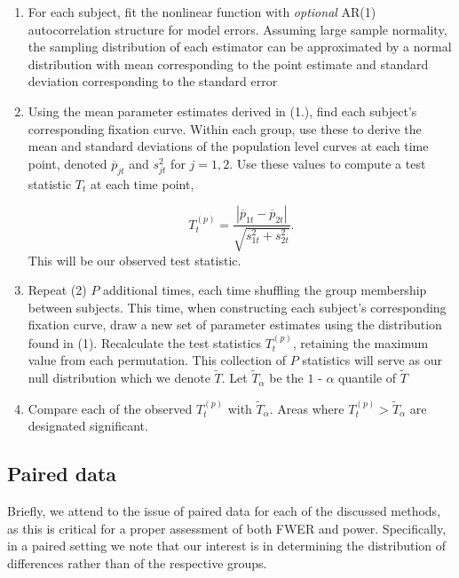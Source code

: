 \documentclass{article}
\begin{document}
\begin{enumerate}
\vspace{-2mm}
\item For each subject, fit the nonlinear function with \textit{optional} AR(1) autocorrelation structure for model errors. Assuming large sample normality, the sampling distribution of each estimator can be approximated by a normal distribution with mean corresponding to the point estimate and standard deviation corresponding to the standard error
\item Using the mean parameter estimates derived in (1.), find each subject's corresponding fixation curve. Within each group, use these to derive the mean and standard deviations of the population level curves at each time point, denoted $\overline{p}_{jt}$ and $s_{jt}^2$ for $j = 1,2$. Use these values to compute a test statistic $T_t$ at each time point,

\begin{equation}
T_t^{(p)} = \frac{|\overline{p}_{1t} - \overline{p}_{2t}|}{\sqrt{s_{1t}^2 + s_{2t}^2}}.
\end{equation}
This will be our observed test statistic.
\item Repeat (2) $P$  additional times, each time shuffling the group membership between subjects. This time, when constructing each subject's corresponding fixation curve, draw a new set of parameter estimates using the distribution found in (1). Recalculate the test statistics $T_t^{(p)}$, retaining the maximum value from each permutation. This collection of $P$ statistics will serve as our null distribution which we denote $\widetilde{T}$. Let $\widetilde{T}_{\alpha}$ be the $1$ - $\alpha$ quantile of $\widetilde{T}$
\item Compare each of the observed $T_t^{(p)}$ with $\widetilde{T}_{\alpha}$. Areas where $T_t^{(p)} > \widetilde{T}_{\alpha}$ are designated significant. 
\end{enumerate}



\subsection{Paired data}

Briefly, we attend to the issue of paired data for each of the discussed methods, as this is critical for a proper assessment of both FWER and power. Specifically, in a paired setting we note that our interest is in determining the distribution of differences rather than of the respective groups. 
\end{document}
